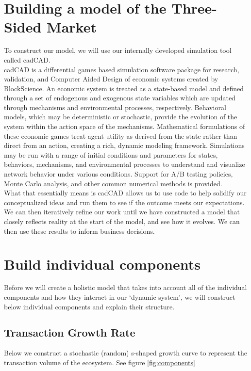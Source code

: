 \documentclass[12pt]{extarticle}
\begin{document}
\section{Building a model of the Three-Sided Market}
To construct our model, we will use our internally developed simulation tool called cadCAD. \\

cadCAD is a differential games based simulation software package for research, validation, and Computer Aided Design of economic systems created by BlockScience. An economic system is treated as a state-based model and defined through a set of endogenous and exogenous state variables which are updated through mechanisms and environmental processes, respectively. Behavioral models, which may be deterministic or stochastic, provide the evolution of the system within the action space of the mechanisms. Mathematical formulations of these economic games treat agent utility as derived from the state rather than direct from an action, creating a rich, dynamic modeling framework. Simulations may be run with a range of initial conditions and parameters for states, behaviors, mechanisms, and environmental processes to understand and visualize network behavior under various conditions. Support for A/B testing policies, Monte Carlo analysis, and other common numerical methods is provided. \\ 

What that essentially means is cadCAD allows us to use code to help solidify our conceptualized ideas and run them to see if the outcome meets our expectations. We can then iteratively refine our work until we have constructed a model that closely reflects reality at the start of the model, and see how it evolves. We can then use these results to inform business decisions.

\section{Build individual components}
Before we will create a holistic model that takes into account all of the individual components and how they interact in our `dynamic system', we will construct below individual components and explain their structure.

\subsection{Transaction Growth Rate}
Below we construct a stochastic (random) s-shaped growth curve to represent the transaction volume of the ecosystem. See figure \ref{fig:components}
\end{document}

